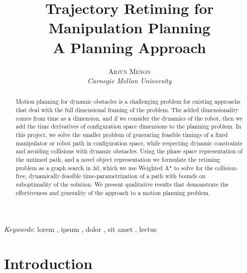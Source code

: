 \documentclass[letterpaper,12pt]{article} %
\title{\textbf{Trajectory Retiming for Manipulation Planning}\\ %
A Planning Approach} %
\author{\textsc{Arjun Menon} %
\\{\textit{Carnegie Mellon University}}} %
\makeatletter
\renewcommand{\maketitle}{ %
\begin{flushright} %
{\LARGE\@title} %

\vspace{5pt} %

{\large\@author} %
\vspace{0pt} %
\end{flushright}
}
\makeatother
\begin{document}
\maketitle %


\renewcommand{\abstractname}{Summary} %

\begin{abstract}
Motion planning for dynamic obstacles is a challenging problem for existing approachs that deal with the
full dimensional framing of the problem. The added dimensionality comes from time as a dimension, and if
we consider the dynamics of the robot, then we add the time derivatives of configuration space dimensions
to the planning problem. In this project, we solve the smaller problem of generating feasible timings of a
fixed manipulator or robot path in configuration space, while respecting dynamic constraints and avoiding
collisions with dynamic obstacles. Using the phase space representation of the untimed path, and a novel
object representation we formulate the retiming problem as a graph search in 3d, which we use Weighted A*
to solve for the collision-free, dynamically-feasible time-parametrization of a path with bounds on 
suboptimality of the solution. We present qualitative results that demonstrate the effectiveness and 
generality of the approach to a motion planning problem.
\end{abstract}

\hspace*{3,6mm}\textit{Keywords:} lorem , ipsum , dolor , sit amet , lectus %

\vspace{10pt} %


\section{Introduction}
\end{document}
